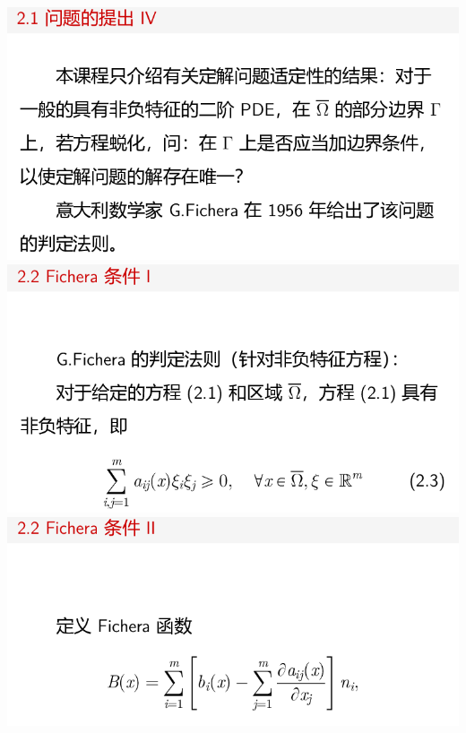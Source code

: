 \documentclass[11pt,a4paper]{ctexart}
\begin{document}
\begin{paracol}{2}
\includegraphics[width=\linewidth]{chap05_21.png}
\includegraphics[width=\linewidth]{chap05_22.png}
\includegraphics[width=\linewidth]{chap05_23.png}
\newpage


\end{paracol}
\end{document}
